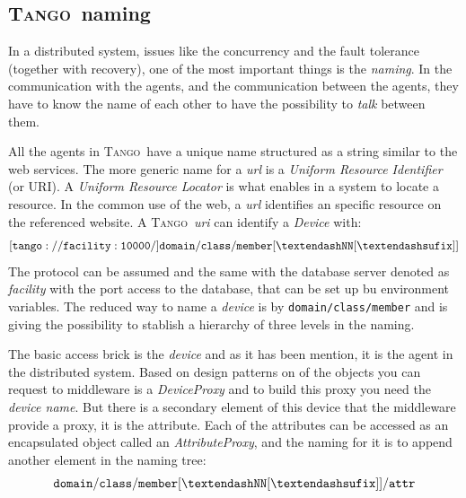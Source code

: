 \documentclass[10pt,a4paper,twoside]{llncs}
\newcommand{\tango}{\textsc{Tango}}
\begin{document}
\subsection{\tango\, naming}

In a distributed system, issues like the concurrency and the fault tolerance (together with recovery), one of the most important things is the \emph{naming}. In the communication with the agents, and the communication between the agents, they have to know the name of each other to have the possibility to \emph{talk} between them.

All the agents in \tango\, have a unique name structured as a string similar to the web services. The more generic name for a \emph{url} is a \emph{Uniform Resource Identifier} (or URI). A \emph{Uniform Resource Locator} is what enables in a system to locate a resource. In the common use of the web, a \emph{url} identifies an specific resource on the referenced website. A \tango\, \emph{uri} can identify a \emph{Device} with:
\begin{equation}
    {\tt [tango://facility:10000/]domain/class/member[\textendash NN[\textendash sufix]]}\label{eq:tangoDeviceFullName}
\end{equation}
The protocol can be assumed and the same with the database server denoted as \emph{facility} with the port access to the database, that can be set up bu environment variables. The reduced way to name a \emph{device} is by {\tt domain/class/member} and is giving the possibility to stablish a hierarchy of three levels in the naming.

The basic access brick is the \emph{device} and as it has been mention, it is the agent in the distributed system. Based on design patterns on of the objects you can request to middleware is a \emph{DeviceProxy} and to build this proxy you need the \emph{device name}. But there is a secondary element of this device that the middleware provide a proxy, it is the attribute. Each of the attributes can be accessed as an encapsulated object called an \emph{AttributeProxy}, and the naming for it is to append another element in the naming tree:
\begin{equation}
    {\tt domain/class/member[\textendash NN[\textendash sufix]]/attr}\label{eq:tangoAttrName}
\end{equation}
\end{document}
